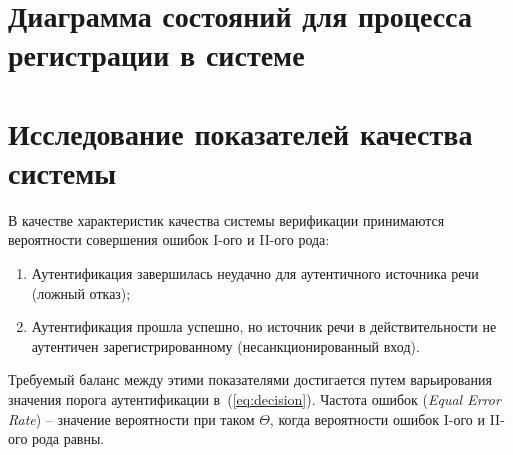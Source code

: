 \documentclass[12pt]{article}
\newcommand{\important}[1]{\emph{#1}}
\begin{document}
\begin{figure}[h!]
\end{figure}

\section{Диаграмма состояний для процесса регистрации в системе}

\begin{figure}[h!]
\end{figure}

\section{Исследование показателей качества системы}

В качестве характеристик качества системы верификации принимаются вероятности совершения ошибок I-ого и II-ого рода:
\begin{enumerate}
\item Аутентификация завершилась неудачно для аутентичного источника речи (ложный отказ);
\item Аутентификация прошла успешно, но источник речи в действительности не аутентичен зарегистрированному (несанкционированный вход).
\end{enumerate}

Требуемый баланс между этими показателями достигается путем варьирования значения порога аутентификации в~(\ref{eq:decision}).
Частота ошибок (\important{Equal Error Rate}) -- значение вероятности при таком $\Theta$, когда вероятности ошибок I-ого и II-ого рода равны.
\end{document}
